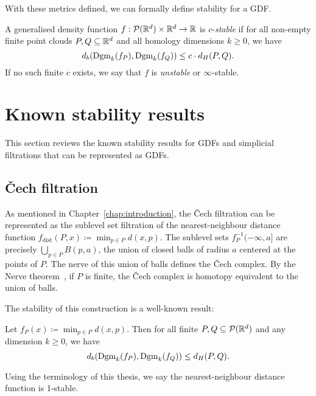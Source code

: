 With these metrics defined, we can formally define stability for a GDF.
\begin{definition}
    A generalised density function $f : \mathcal{P}(\mathbb{R}^d) \times \mathbb{R}^d \to \mathbb{R}$ is
    $c$-\emph{stable} if for all non-empty finite point clouds $P, Q \subseteq
    \mathbb{R}^d$ and all homology dimensions $k \geq 0$, we have
    \begin{equation}
        d_b(\operatorname{Dgm}_k(f_P), \operatorname{Dgm}_k(f_Q)) \leq c \cdot d_H(P, Q).
    \end{equation}
    If no such finite $c$ exists, we say that $f$ is \emph{unstable} or
    $\infty$-stable.
\end{definition}

\section{Known stability results}
\label{sec:known_stability_results}

This section reviews the known stability results for GDFs and simplicial
filtrations that can be represented as GDFs.

\subsection{\v{C}ech filtration}
As mentioned in Chapter~\ref{chap:introduction}, the \v{C}ech filtration can be
represented as the sublevel set filtration of the nearest-neighbour distance
function $f_{\mathrm{dist}}(P, x) \coloneqq \min_{p\in P} d(x, p)$.
The sublevel sets $f_P^{-1}(-\infty, a]$ are precisely
$\bigcup_{p\in P} B(p, a)$, the union of closed balls of radius $a$ centered at
the points of $P$. The nerve of this union of balls defines the \v{C}ech
complex. By the Nerve theorem~\cite{Borsuk1948,leray1945forme}, if $P$ is finite,
the \v{C}ech complex is homotopy equivalent to the union of balls.

The stability of this construction is a well-known result:
\begin{theorem}
    Let $f_P(x) \coloneqq \min_{p\in P} d(x, p)$. Then for all finite
    $P, Q \subseteq \mathcal{P}(\mathbb{R}^d)$ and any dimension $k \geq 0$, we have
    \begin{equation}
        d_b(\operatorname{Dgm}_k(f_P), \operatorname{Dgm}_k(f_Q)) \leq d_H(P, Q).
    \end{equation}
\end{theorem}
Using the terminology of this thesis, we say the nearest-neighbour distance
function is 1-stable.

